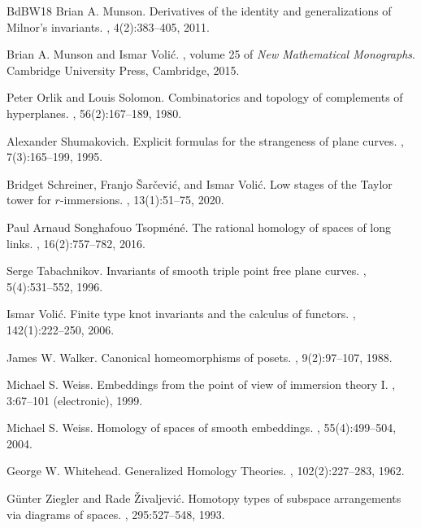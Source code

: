 \documentclass[12pt]{amsart}
\theoremstyle{plain}
\theoremstyle{definition}
\theoremstyle{remark}
\begin{document}
\begin{thebibliography}{BdBW18}
 Brian A. Munson.
\newblock Derivatives of the identity and generalizations of {M}ilnor's invariants.
, 4(2):383--405, 2011.


Brian A. Munson and Ismar Voli{\'c}.
,
\newblock volume 25 of {\em New Mathematical Monographs}. Cambridge University Press, Cambridge, 2015.

Peter Orlik and Louis Solomon.
\newblock Combinatorics and topology of complements of hyperplanes.
, 56(2):167--189, 1980.


Alexander Shumakovich.
\newblock Explicit formulas for the strangeness of plane curves.
, 7(3):165--199, 1995.

Bridget Schreiner, Franjo {\v S}ar{\v c}evi{\'c}, and Ismar Voli{\'c}.
\newblock Low stages of the {T}aylor tower for $r$-immersions.
, 13(1):51--75, 2020.

Paul Arnaud Songhafouo Tsopm\'{e}n\'{e}.
\newblock The rational homology of spaces of long links.
, 16(2):757--782, 2016.

Serge Tabachnikov.
\newblock Invariants of smooth triple point free plane curves.
, 5(4):531--552, 1996.


 Ismar Voli{\'c}.
\newblock Finite type knot invariants and the calculus of functors.
, 142(1):222--250, 2006.


James W. Walker.
\newblock Canonical homeomorphisms of posets.
, 9(2):97--107, 1988.


Michael S. Weiss.
\newblock Embeddings from the point of view of immersion theory {I}.
, 3:67--101 (electronic), 1999.

Michael S. Weiss.
\newblock Homology of spaces of smooth embeddings.
, 55(4):499--504, 2004.

George W. Whitehead.
\newblock Generalized Homology Theories.
, 102(2):227--283, 1962.

Günter Ziegler and Rade {\v Z}ivaljevi{\'c}.
\newblock Homotopy types of subspace arrangements via diagrams of spaces.
, 295:527--548, 1993.

\end{thebibliography}






\pagestyle{plain}
\end{document}
